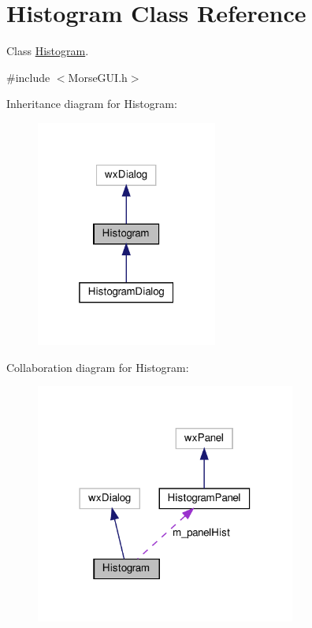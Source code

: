 \hypertarget{classHistogram}{}\section{Histogram Class Reference}
\label{classHistogram}


Class \hyperlink{classHistogram}{Histogram}.  




{\ttfamily \#include $<$Morse\+G\+U\+I.\+h$>$}



Inheritance diagram for Histogram\+:\nopagebreak
\begin{figure}[H]
\begin{center}
\leavevmode
\includegraphics[width=169pt]{classHistogram__inherit__graph}
\end{center}
\end{figure}


Collaboration diagram for Histogram\+:\nopagebreak
\begin{figure}[H]
\begin{center}
\leavevmode
\includegraphics[width=242pt]{classHistogram__coll__graph}
\end{center}
\end{figure}
